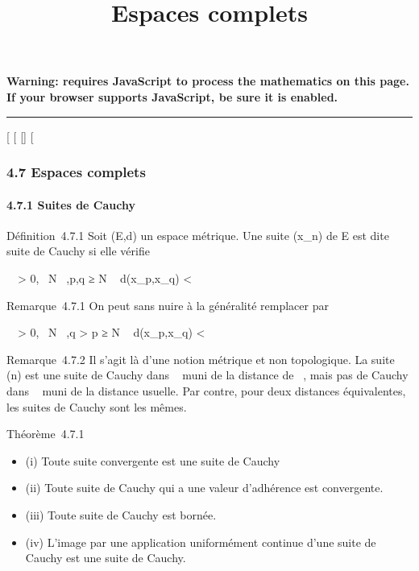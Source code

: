 \documentclass[]{article}
\title{Espaces complets}
\author{}
\date{}
\begin{document}
\maketitle

\textbf{Warning: 
requires JavaScript to process the mathematics on this page.\\ If your
browser supports JavaScript, be sure it is enabled.}

\begin{center}\rule{3in}{0.4pt}\end{center}

{[}
{[}
{[}{]}
{[}

\subsubsection{4.7 Espaces complets}

\paragraph{4.7.1 Suites de Cauchy}

Définition~4.7.1 Soit (E,d) un espace métrique. Une suite (x_n)
de E est dite suite de Cauchy si elle vérifie

\forall~~\epsilon \textgreater{} 0,
\exists~N \in {}~,\quad p,q ≥ N \rigtharrow~
d(x_p,x_q) \textless{} \epsilon

Remarque~4.7.1 On peut sans nuire à la généralité remplacer par

\forall~~\epsilon \textgreater{} 0,
\exists~N \in {}~,\quad q \textgreater{} p
≥ N \rigtharrow~ d(x_p,x_q) \textless{} \epsilon

Remarque~4.7.2 Il s'agit là d'une notion métrique et non topologique. La
suite (n) est une suite de Cauchy dans ~ muni de la distance de
\overline{}~, mais pas de Cauchy dans ~ muni de la
distance usuelle. Par contre, pour deux distances équivalentes, les
suites de Cauchy sont les mêmes.

Théorème~4.7.1

\begin{itemize}
\itemsep1pt\parskip0pt
\item
  (i) Toute suite convergente est une suite de Cauchy
\item
  (ii) Toute suite de Cauchy qui a une valeur d'adhérence est
  convergente.
\item
  (iii) Toute suite de Cauchy est bornée.
\item
  (iv) L'image par une application uniformément continue d'une suite de
  Cauchy est une suite de Cauchy.
\end{itemize}
\end{document}
